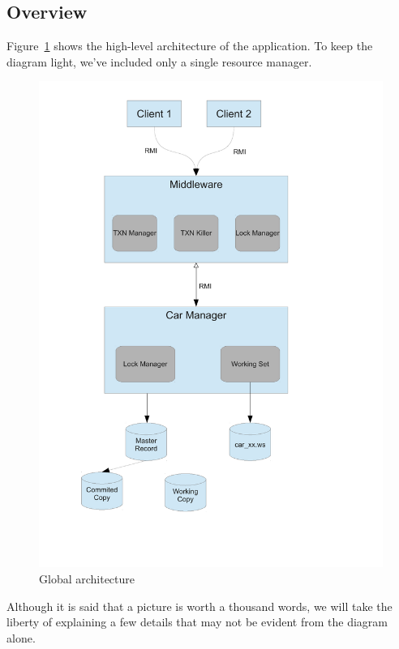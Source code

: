 \documentclass[11pt]{article}
\begin{document}
\subsection{Overview}

Figure~\ref{fig:architecture} shows the high-level architecture of the
application.  To keep the diagram light, we've included only a single
resource manager.

\begin{figure}[H]
  \caption{Global architecture}
  \label{fig:architecture}

  \begin{center}
    \includegraphics[scale=0.5]{architecture.pdf}
  \end{center}
\end{figure}

Although it is said that a picture is worth a thousand words, we will
take the liberty of explaining a few details that may not be evident
from the diagram alone.
\end{document}
